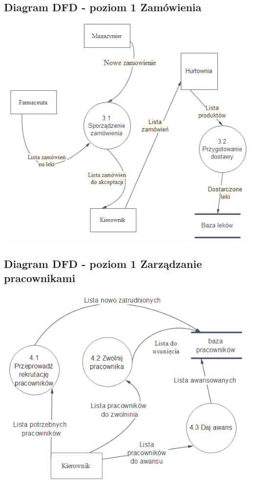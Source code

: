 \documentclass[a4paper, 11pt]{article}
\begin{document}
	\subsection{Diagram DFD - poziom 1 Zamówienia}
		\includegraphics[scale=1]{zamowienia2.PNG} 
		
	\subsection{Diagram DFD - poziom 1 Zarządzanie pracownikami}
		\includegraphics[scale=1]{zarzadzaniePracownikami2.PNG} 
		
\end{document}
